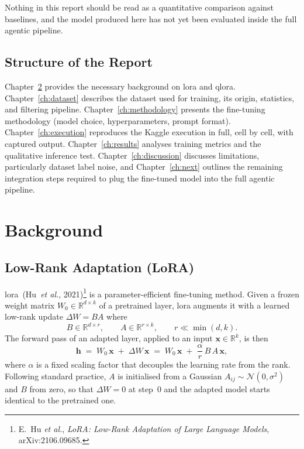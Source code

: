 \documentclass[12pt, a4paper]{report}
\begin{document}
Nothing in this report should be read as a quantitative comparison
against baselines, and the model produced here has not yet been
evaluated inside the full agentic pipeline.

\section{Structure of the Report}

Chapter~\ref{ch:background} provides the necessary background on \gls{lora}
and \gls{qlora}. Chapter~\ref{ch:dataset} describes the dataset used for
training, its origin, statistics, and filtering pipeline.
Chapter~\ref{ch:methodology} presents the fine-tuning methodology
(model choice, hyperparameters, prompt format).
Chapter~\ref{ch:execution} reproduces the Kaggle execution in full,
cell by cell, with captured output.
Chapter~\ref{ch:results} analyses training metrics and the qualitative
inference test.
Chapter~\ref{ch:discussion} discusses limitations, particularly dataset
label noise, and Chapter~\ref{ch:next} outlines the remaining integration
steps required to plug the fine-tuned model into the full agentic pipeline.

\chapter{Background}
\label{ch:background}

\section{Low-Rank Adaptation (LoRA)}
\label{sec:lora}

\gls{lora}~(Hu~\emph{et al.}, 2021)\footnote{E.~Hu \emph{et al.},
\emph{LoRA: Low-Rank Adaptation of Large Language Models}, arXiv:2106.09685.}
is a parameter-efficient fine-tuning method. Given a frozen weight matrix
\(W_0 \in \mathbb{R}^{d \times k}\) of a pretrained layer, \gls{lora}
augments it with a learned low-rank update \(\Delta W = B A\) where
\begin{equation}
  B \in \mathbb{R}^{d \times r}, \qquad
  A \in \mathbb{R}^{r \times k}, \qquad
  r \ll \min(d, k).
  \label{eq:lora-factors}
\end{equation}
The forward pass of an adapted layer, applied to an input
\(\bm{x} \in \mathbb{R}^{k}\), is then
\begin{equation}
  \bm{h} \;=\; W_0\,\bm{x} \;+\; \Delta W\,\bm{x}
          \;=\; W_0\,\bm{x} \;+\; \frac{\alpha}{r}\,B\,A\,\bm{x},
  \label{eq:lora-forward}
\end{equation}
where \(\alpha\) is a fixed scaling factor that decouples the learning rate
from the rank. Following standard practice, \(A\) is initialised from a
Gaussian \(A_{ij} \sim \mathcal{N}(0,\sigma^{2})\) and \(B\) from zero, so
that \(\Delta W = 0\) at step~0 and the adapted model starts identical to
the pretrained one.
\end{document}
